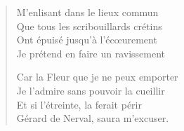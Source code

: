 %
%
%
%
%


\begin{verse}
M’enlisant dans le lieux commun\\
Que tous les scribouillards crétins\\
Ont épuisé jusqu’à l’écœurement\\
Je prétend en faire un ravissement

Car la Fleur que je ne peux emporter\\
Je l’admire  sans pouvoir la cueillir\\
Et si l’étreinte,  la ferait périr\\
Gérard de Nerval, saura m’excuser.
\end{verse}


